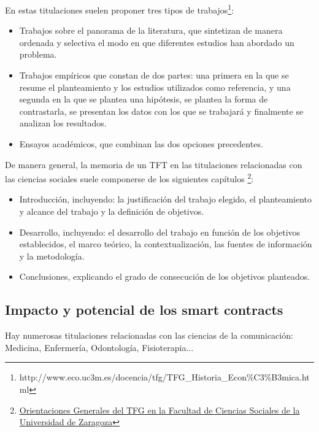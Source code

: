 \documentclass[12pt,spanish,chapterprefix, numbers=noenddot]{book}
\numberwithin{equation}{section}
\numberwithin{figure}{section}
\begin{document}
    En estas titulaciones suelen proponer tres tipos de trabajos\footnote{http://www.eco.uc3m.es/docencia/tfg/TFG\_Historia\_Econ\%C3\%B3mica.html}:
    \begin{itemize}
        \item Trabajos sobre el panorama de la literatura, que sintetizan de manera
        ordenada y selectiva el modo en que diferentes estudios han abordado
        un problema.
        \item Trabajos empíricos que constan de dos partes: una primera en la que
        se resume el planteamiento y los estudios utilizados como referencia,
        y una segunda en la que se plantea una hipótesis, se plantea la forma
        de contrastarla, se presentan los datos con los que se trabajará y
        finalmente se analizan los resultados.
        \item Ensayos académicos, que combinan las dos opciones precedentes.
    \end{itemize}
    De manera general, la memoria de un TFT en las titulaciones relacionadas
    con las ciencias sociales suele componerse de los siguientes capítulos
    \footnote{\href{https://sociales.unizar.es/sites/sociales.unizar.es/files/users/sociales/TS/tfg/orientaciones_generales_tfg_ts_2016_0.pdf}{Orientaciones Generales del TFG en la Facultad de Ciencias Sociales de la Universidad de Zaragoza}}:
    \begin{itemize}
        \item Introducción, incluyendo: la justificación del trabajo elegido, el
        planteamiento y alcance del trabajo y la definición de objetivos.
        \item Desarrollo, incluyendo: el desarrollo del trabajo en función de los
        objetivos establecidos, el marco teórico, la contextualización, las
        fuentes de información y la metodología.
        \item Conclusiones, explicando el grado de consecución de los objetivos
        planteados.
    \end{itemize}

    \subsection{Impacto y potencial de los smart contracts}

    Hay numerosas titulaciones relacionadas con las ciencias de la comunicación:
    Medicina, Enfermería, Odontología, Fisioterapia...
\end{document}
